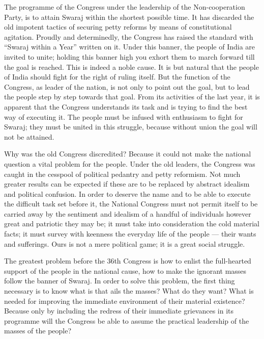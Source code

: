 The programme of the Congress under the leadership of the Non-cooperation Party, is to attain Swaraj within the shortest possible time. It has discarded the old impotent tactics of securing petty reforms by means of constitutional agitation. Proudly and determinedly, the Congress has raised the standard with “Swaraj within a Year” written on it. Under this banner, the people of India are invited to unite; holding 
this banner high you exhort them to march forward till the goal is reached. This is indeed a noble cause. It is but natural that the people of India should fight for the right of ruling itself. But the function of the Congress, as leader of the nation, is not only to point out the goal, but to lead the people step by step towards that goal. From its activities of the last year, it is apparent that the Congress understands its task and is trying to find the best way of executing it. The people must be infused with enthusiasm to fight for Swaraj; they must be united in this struggle, because without union the goal will not be attained. 

Why was the old Congress discredited? Because it could not make the national question a vital problem for the people. Under the old leaders, the Congress was caught in the cesspool of political pedantry and petty reformism. Not much greater results can be expected if these are to be replaced by abstract idealism and political confusion. In order to deserve the name and to be able to execute the difficult task set before it, the National Congress must not permit itself to be carried away by the sentiment and idealism of a handful of individuals however great and patriotic they may be; it must take into consideration the cold material facts; it must survey with keenness the everyday life of the people — their wants and sufferings. Ours is not a mere political game; it is a great social struggle. 

The greatest problem before the 36th Congress is how to enlist the full-hearted support of the people in the national cause, how to make the ignorant masses follow the banner of Swaraj. In order to solve this problem, the first thing necessary is to know what is that ails the masses? What do they want? What is needed for improving the immediate environment of their material existence? Because only by including the redress of their immediate grievances in its programme will the Congress be able to assume the practical leadership of the masses of the people? 

